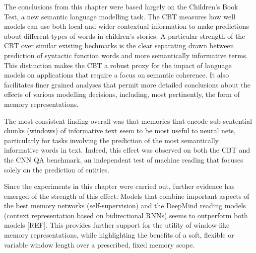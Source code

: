 The conclusions from this chapter were based largely on the Children's Book Test, a new semantic language modelling task. The CBT measures how well models can use both local and wider contextual information to make predictions about different types of words in children's stories. A particular strength of the CBT over similar existing bechmarks is the clear separating drawn between prediction of syntactic function words and more semantically informative terms. This distinction makes the CBT a robust proxy for the impact of language models on applications that require a focus on semantic coherence. It also facilitates finer grained analyses that permit more detailed conclusions about the effects of various modelling decisions, including, most pertinently, the form of memory representations. 

The most consistent finding overall was that memories that encode sub-sentential chunks (windows) of informative text 
seem to be most useful to neural nets, particularly for tasks involving the prediction of the most semantically informative words in text. 
Indeed, this effect was observed on both the CBT and the CNN QA benchmark, an independent test of machine reading that focuses solely on the prediction of entities. 

Since the experiments in this chapter were carried out, further evidence has emerged of the strength of this effect. Models that combine important aspects of the best memory networks (self-supervision) and the DeepMind reading models (context representation based on bidirectional RNNs) seems to outperform both models [REF]. This provides further support for the utility of window-like memory representations, while highlighting the benefits of a soft, flexible or variable window length over a prescribed, fixed memory scope.  


